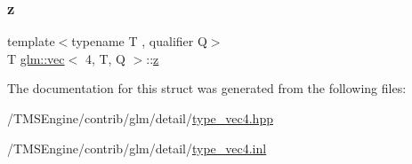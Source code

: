 \subsubsection{\texorpdfstring{z}{z}}
{\footnotesize\ttfamily template$<$typename T , qualifier Q$>$ \\
T \hyperlink{structglm_1_1vec}{glm\+::vec}$<$ 4, T, Q $>$\+::\hyperlink{_s_d_l__opengl__glext_8h_a5e74030ebb3297ce1b37ff716fedd68f}{z}}



The documentation for this struct was generated from the following files\+:\begin{DoxyCompactItemize}
\item 
/\+T\+M\+S\+Engine/contrib/glm/detail/\hyperlink{type__vec4_8hpp}{type\+\_\+vec4.\+hpp}\item 
/\+T\+M\+S\+Engine/contrib/glm/detail/\hyperlink{type__vec4_8inl}{type\+\_\+vec4.\+inl}\end{DoxyCompactItemize}
